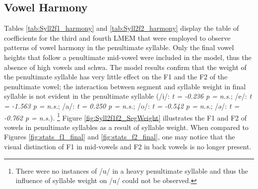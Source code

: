 \documentclass[12pt]{ouparticle}
\begin{document}
\subsection{Vowel Harmony}\label{sec:harmony}


Tables \ref{tab:Syll2f1_harmony} and \ref{tab:Syll2f2_harmony} display the table of coefficients for the third and fourth LMEM that were employed to observe patterns of vowel harmony in the penultimate syllable. Only the final vowel heights that follow a penultimate mid-vowel were included in the model, thus the absence of high vowels and schwa. The model results confirm that the weight of the penultimate syllable has very little effect on the F1 and the F2 of the penultimate vowel; the interaction between segment and syllable weight in final syllable is not evident in the penultimate syllable (/i/: \textit{t = -0.236 p = n.s.}; /e/: \textit{t = -1.563  p = n.s.}; /a/: \textit{t = 0.250   p = n.s.}; /o/: \textit{t = -0.542  p = n.s}.; /ə/: \textit{t = -0.762  p = n.s.}). \footnote{There were no instances of /u/ in a heavy penultimate syllable and thus the influence of syllable weight on /u/ could not be observed.} Figure \ref{fig:Syll2f1f2_SegWeight} illustrates the F1 and F2 of vowels in penultimate syllables as a result of syllable weight. When compared to Figures \ref{fig:stats_f1_final} and \ref{fig:stats_f2_final}, one may notice that the visual distinction of F1 in mid-vowels and F2 in back vowels is no longer present.
\end{document}
